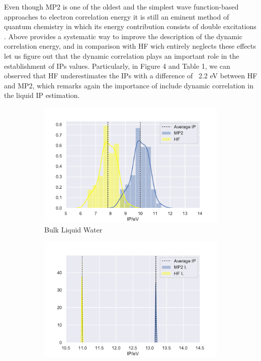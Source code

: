 \documentclass[12pt,a4paper]{article}
\begin{document}
Even though MP2 is one of the oldest and the simplest wave function-based approaches to electron correlation energy
it is still an eminent method 
of quantum chemistry in which its energy contribution consists of double excitations \cite{fink2016does}. 
Above provides a systematic way to
improve the description of the dynamic correlation energy, and in comparison with HF\cite{marshall1961unrestricted} 
wich entirely neglects these 
effects let us figure out that the dynamic correlation plays an important role in the establishment of IPs values.
Particularly, in Figure 4 and
Table 1, we can observed that HF underestimates the IPs with a difference of ~2.2 eV between HF and MP2,
which remarks again the importance of
include dynamic correlation in the liquid IP estimation. \\

\begin{figure}[!ht]
        \captionsetup[subfigure]{labelformat=empty}
        \centering
        \begin{subfigure}{0.4\linewidth}
                \includegraphics[width=\linewidth]{images/bulkhfmp2}
                \caption{Bulk Liquid Water}
        \end{subfigure}
        \begin{subfigure}{0.4\linewidth}
                \includegraphics[width=\linewidth]{images/isomp2dft}

\end{subfigure}
\end{figure}
\end{document}
